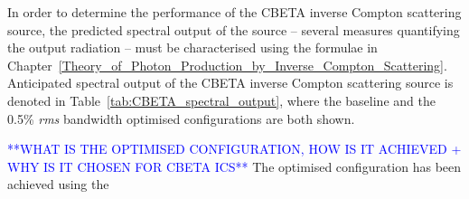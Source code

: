 \documentclass[../main.tex]{subfiles}
\begin{document}
In order to determine the performance of the CBETA inverse Compton scattering source, the predicted spectral output of the source -- several measures quantifying the output radiation -- must be characterised using the formulae in Chapter~\ref{Theory_of_Photon_Production_by_Inverse_Compton_Scattering}. Anticipated spectral output of the CBETA inverse Compton scattering source is denoted in Table~\ref{tab:CBETA_spectral_output}, where the baseline and the 0.5\% \textit{rms} bandwidth optimised configurations are both shown. 

\textcolor{blue}{**WHAT IS THE OPTIMISED CONFIGURATION, HOW IS IT ACHIEVED + WHY IS IT CHOSEN FOR CBETA ICS**}
The optimised configuration has been achieved using the 

\begin{table}[!h]
\caption{Anticipated photon output for each of the four electron beam energies in CBETA, taking into account a 5~degree crossing angle. The recoil parameter is negligible $X < 0.003$, even at  150~MeV -- the maximum electron beam energy. The collimated flux has been optimised for a 0.5\% \textit{rms} bandwidth and the baseline case focuses at the IP to $\beta^{*} =1$~\si{\centi\meter} for each nominal energy.}
\label{tab:CBETA_spectral_output}
\end{table}
\end{document}
